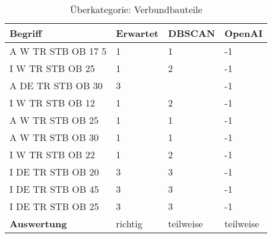 \begin{table}[h]
	
	\centering
	\begin{tabular}{|l|l|l|l|}
		\hline
		\textbf{Begriff} & \textbf{Erwartet} & \textbf{DBSCAN} & \textbf{OpenAI}\\ \hline
		  A W TR STB OB 17 5 & 1 & 1 & -1 \\ \hline
		I W TR STB OB 25 & 1 & 2 & -1 \\ \hline
		A DE TR STB OB 30 & 3 & ~ & -1 \\ \hline
		I W TR STB OB 12 & 1 & 2 & -1 \\ \hline
		A W TR STB OB 25 & 1 & 1 & -1 \\ \hline
		A W TR STB OB 30 & 1 & 1 & -1 \\ \hline
		I W TR STB OB 22 & 1 & 2 & -1 \\ \hline
		I DE TR STB OB 20 & 3 & 3 & -1 \\ \hline
		I DE TR STB OB 45 & 3 & 3 & -1 \\ \hline
		I DE TR STB OB 25 & 3 & 3 & -1 \\ \hline
		\textbf{Auswertung} & richtig & teilweise & teilweise \\ \hline
	\end{tabular}
	\caption{Überkategorie: Verbundbauteile}
	\label{t:evaluation-example22}
\end{table}




